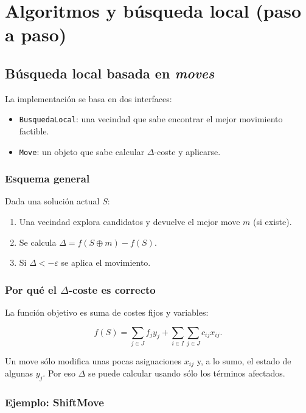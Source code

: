 \documentclass[12pt, a4paper]{report}
\begin{document}
\chapter{Algoritmos y búsqueda local (paso a paso)}

\section{Búsqueda local basada en \emph{moves}}

La implementación se basa en dos interfaces:

\begin{itemize}
  \item \texttt{BusquedaLocal}: una vecindad que sabe encontrar el mejor movimiento factible.
  \item \texttt{Move}: un objeto que sabe calcular $\Delta$-coste y aplicarse.
\end{itemize}

\subsection{Esquema general}

Dada una solución actual $S$:

\begin{enumerate}
  \item Una vecindad explora candidatos y devuelve el mejor move $m$ (si existe).
  \item Se calcula $\Delta = f(S\oplus m) - f(S)$.
  \item Si $\Delta < -\varepsilon$ se aplica el movimiento.
\end{enumerate}

\subsection{Por qué el $\Delta$-coste es correcto}

La función objetivo es suma de costes fijos y variables:

\[
 f(S) = \sum_{j\in J} f_j y_j + \sum_{i\in I} \sum_{j\in J} c_{ij} x_{ij}.
\]

Un move sólo modifica unas pocas asignaciones $x_{ij}$ y, a lo sumo, el estado de algunas $y_j$. Por eso $\Delta$ se puede calcular usando sólo los términos afectados.

\subsection{Ejemplo: ShiftMove}
\end{document}
